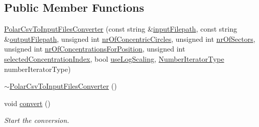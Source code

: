 \subsection*{\-Public \-Member \-Functions}
\begin{DoxyCompactItemize}
\item 
\hyperlink{classmultiscale_1_1video_1_1PolarCsvToInputFilesConverter_a4e3b77194b9706370e25b7eeba416cda}{\-Polar\-Csv\-To\-Input\-Files\-Converter} (const string \&\hyperlink{classmultiscale_1_1video_1_1PolarCsvToInputFilesConverter_a7b33b6d00b5e0d809f4fb0d76985ab59}{input\-Filepath}, const string \&\hyperlink{classmultiscale_1_1video_1_1PolarCsvToInputFilesConverter_a1033d31c9bfc7ccad08337c7b0fa6e6e}{output\-Filepath}, unsigned int \hyperlink{classmultiscale_1_1video_1_1PolarCsvToInputFilesConverter_a7aa37d18880e822369cbe118a093e24f}{nr\-Of\-Concentric\-Circles}, unsigned int \hyperlink{classmultiscale_1_1video_1_1PolarCsvToInputFilesConverter_a9246a2c9749602af145d5579bde8a9d1}{nr\-Of\-Sectors}, unsigned int \hyperlink{classmultiscale_1_1video_1_1PolarCsvToInputFilesConverter_a3a9301788514c50c295ca113a4114938}{nr\-Of\-Concentrations\-For\-Position}, unsigned int \hyperlink{classmultiscale_1_1video_1_1PolarCsvToInputFilesConverter_a121d592659f9f5075c8c78aa46c2950c}{selected\-Concentration\-Index}, bool \hyperlink{classmultiscale_1_1video_1_1PolarCsvToInputFilesConverter_af07bf56fc39bb226a6e2596f35ada0d7}{use\-Log\-Scaling}, \hyperlink{namespacemultiscale_a6ef911f4d48a4bf5e657c237ec169ff5}{\-Number\-Iterator\-Type} number\-Iterator\-Type)
\item 
\hyperlink{classmultiscale_1_1video_1_1PolarCsvToInputFilesConverter_afdd156ae24d5d6194b113dd661110ed5}{$\sim$\-Polar\-Csv\-To\-Input\-Files\-Converter} ()
\item 
void \hyperlink{classmultiscale_1_1video_1_1PolarCsvToInputFilesConverter_a818c188569ad54cb0cfbbaa2bd32356c}{convert} ()
\begin{DoxyCompactList}\small\item\em \-Start the conversion. \end{DoxyCompactList}\end{DoxyCompactItemize}
